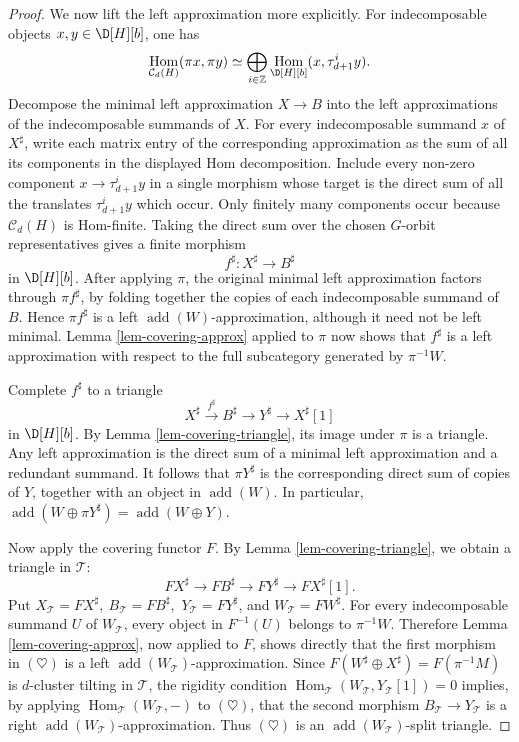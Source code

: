 \documentclass[12pt]{article}
\theoremstyle{plain}
\theoremstyle{definition}
\DeclareMathOperator{\add}{add}
\DeclareMathOperator{\Hom}{Hom}
\newcommand{\Db}[1][]{\D[#1][b]}
\begin{document}
\begin{proof}
We now lift the left approximation more explicitly.  For indecomposable
objects \(x,y\in\Db[H]\), one has
\[
\Hom_{\mathcal C_d(H)}(\pi x,\pi y)
 \simeq \bigoplus_{i\in\mathbb Z}
 \Hom_{\Db[H]}(x,\tau_{d+1}^{i}y).
\]
Decompose the minimal left approximation \(X\to B\) into the left
approximations of the indecomposable summands of \(X\).  For every
indecomposable summand \(x\) of \(X^\sharp\), write each matrix entry of the
corresponding approximation as the sum of all its components in the displayed
Hom decomposition.  Include every non-zero component
\(x\to\tau_{d+1}^{i}y\) in a single morphism whose target is the direct sum
of all the translates \(\tau_{d+1}^{i}y\) which occur.  Only finitely many
components occur because \(\mathcal C_d(H)\) is Hom-finite.  Taking the
direct sum over the chosen \(G\)-orbit representatives gives a finite
morphism
\[
f^\sharp:X^\sharp\longrightarrow B^\sharp
\]
in \(\Db[H]\).  After applying \(\pi\), the original minimal left
approximation factors through \(\pi f^\sharp\), by folding together the
copies of each indecomposable summand of \(B\).  Hence \(\pi f^\sharp\) is a
left \(\add(W)\)-approximation, although it need not be left minimal.  Lemma
\ref{lem-covering-approx} applied to \(\pi\) now shows that \(f^\sharp\) is a
left approximation with respect to the full subcategory generated by
\(\pi^{-1}W\).

Complete \(f^\sharp\) to a triangle
\[
X^\sharp\xrightarrow{f^\sharp} B^\sharp\longrightarrow
Y^\sharp\longrightarrow X^\sharp[1]
\]
in \(\Db[H]\).  By Lemma \ref{lem-covering-triangle}, its image under \(\pi\)
is a triangle.  Any left approximation is the direct sum of a minimal left
approximation and a redundant summand.  It follows that \(\pi Y^\sharp\) is
the corresponding direct sum of copies of \(Y\), together with an object in
\(\add(W)\).  In particular,
\(\add(W\oplus\pi Y^\sharp)=\add(W\oplus Y)\).

Now apply the covering functor \(F\).  By Lemma \ref{lem-covering-triangle},
we obtain a triangle in \(\mathcal T\):
\[
F X^\sharp\longrightarrow F B^\sharp\longrightarrow
F Y^\sharp\longrightarrow F X^\sharp[1].
\tag{\(\heartsuit\)}
\]
Put
\(X_{\mathcal T}=F X^\sharp,\ B_{\mathcal T}=F B^\sharp,\)
\(Y_{\mathcal T}=F Y^\sharp\), and \(W_{\mathcal T}=FW^\sharp\).
For every indecomposable summand \(U\) of \(W_{\mathcal T}\), every object
in \(F^{-1}(U)\) belongs to \(\pi^{-1}W\).  Therefore Lemma
\ref{lem-covering-approx}, now applied to \(F\), shows directly that the
first morphism in \((\heartsuit)\) is a left
\(\add(W_{\mathcal T})\)-approximation.  Since
\(F(W^\sharp\oplus X^\sharp)=F(\pi^{-1}M)\) is \(d\)-cluster tilting in
\(\mathcal T\), the rigidity condition
\(\Hom_{\mathcal T}(W_{\mathcal T},Y_{\mathcal T}[1])=0\)
implies, by applying \(\Hom_{\mathcal T}(W_{\mathcal T},-)\) to
\((\heartsuit)\), that the second morphism
\(B_{\mathcal T}\to Y_{\mathcal T}\) is a right
\(\add(W_{\mathcal T})\)-approximation.  Thus \((\heartsuit)\) is an
\(\add(W_{\mathcal T})\)-split triangle.


\end{proof}
\end{document}

